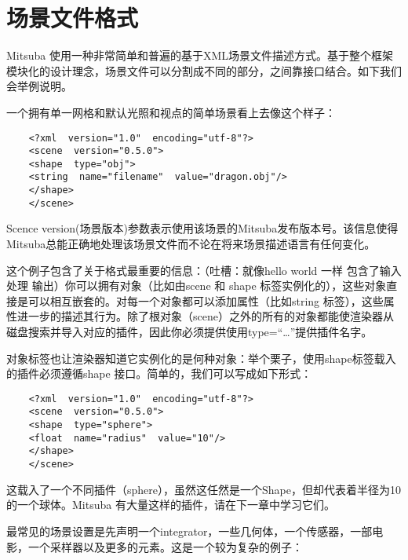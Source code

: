 \chapter{场景文件格式}
Mitsuba 使用一种非常简单和普遍的基于XML场景文件描述方式。基于整个框架模块化的设计理念，场景文件可以分割成不同的部分，之间靠接口结合。如下我们会举例说明。
\par 
一个拥有单一网格和默认光照和视点的简单场景看上去像这个样子：
\begin{lstlisting}
	<?xml  version="1.0"  encoding="utf-8"?>
	<scene  version="0.5.0">
	<shape  type="obj">
	<string  name="filename"  value="dragon.obj"/>
	</shape>
	</scene>
\end{lstlisting}
\par 
Scence version(场景版本)参数表示使用该场景的Mitsuba发布版本号。该信息使得Mitsuba总能正确地处理该场景文件而不论在将来场景描述语言有任何变化。
\par 
这个例子包含了关于格式最重要的信息：（吐槽：就像hello world 一样 包含了输入 处理 输出）你可以拥有对象（比如由scene 和 shape 标签实例化的），这些对象直接是可以相互嵌套的。对每一个对象都可以添加属性（比如string 标签），这些属性进一步的描述其行为。除了根对象（scene）之外的所有的对象都能使渲染器从磁盘搜索并导入对应的插件，因此你必须提供使用type=“…”提供插件名字。
\par 
对象标签也让渲染器知道它实例化的是何种对象：举个栗子，使用shape标签载入的插件必须遵循shape 接口。简单的，我们可以写成如下形式：
\begin{lstlisting}
	<?xml  version="1.0"  encoding="utf-8"?>
	<scene  version="0.5.0">
	<shape  type="sphere">
	<float  name="radius"  value="10"/>
	</shape>
	</scene>
\end{lstlisting}
\par 
这载入了一个不同插件（sphere），虽然这任然是一个Shape，但却代表着半径为10的一个球体。Mitsuba 有大量这样的插件，请在下一章中学习它们。
\par 
最常见的场景设置是先声明一个integrator，一些几何体，一个传感器，一部电影，一个采样器以及更多的元素。这是一个较为复杂的例子：
